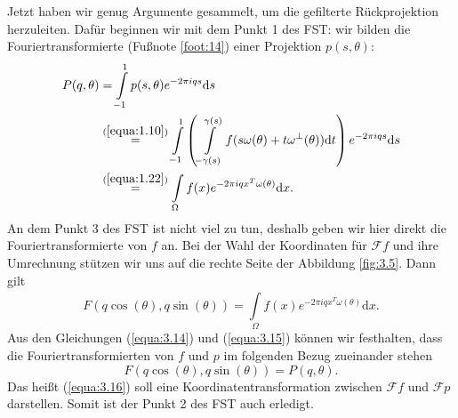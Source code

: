 Jetzt haben wir genug Argumente gesammelt, um die gefilterte Rückprojektion herzuleiten. Dafür beginnen wir mit dem Punkt 1 des FST: wir bilden die Fouriertransformierte (Fußnote \ref{foot:14}) einer Projektion $p(s, \theta)$:
\begin{equation}
	\begin{split}
		P(q, \theta) & = \int \limits_{-1}^{1} p(s, \theta) e^{-2\pi i qs} \mbox{d}s \\
		&  \stackrel{(\ref{equa:1.10})}{=} \int \limits_{-1}^{1} \left( \int\limits_{-\gamma(s)}^{\gamma(s)} f(s\omega(\theta) + t\omega^{\perp}(\theta)) \mbox{d}t \right) e^{-2\pi i qs} \mbox{d}s \\
		& \stackrel{(\ref{equa:1.22})}{=} \int \limits_{\Omega} f(x) e^{-2\pi i q x^T\omega(\theta)}\mbox{d}x.	
	\end{split}
	\label{equa:3.14}
\end{equation}	
An dem Punkt 3 des FST ist nicht viel zu tun, deshalb geben wir hier direkt die Fouriertransformierte von $f$ an. Bei der Wahl der Koordinaten für $\mathcal{F}f$ und ihre Umrechnung stützen wir uns auf die rechte Seite der Abbildung \ref{fig:3.5}. Dann gilt 
\begin{equation}
	 F(q\cos(\theta), q\sin(\theta)) = \int \limits_{\Omega}^{} f(x)e^{-2\pi i qx^T\omega(\theta)} \mbox{d}x.
	\label{equa:3.15}
\end{equation}
Aus den Gleichungen (\ref{equa:3.14}) und (\ref{equa:3.15}) können wir festhalten, dass die Fouriertransformierten von $f$ und $p$ im folgenden Bezug zueinander stehen
\begin{equation}
	F(q\cos(\theta), q\sin(\theta)) =  P(q, \theta).
	\label{equa:3.16}
\end{equation}   
Das heißt (\ref{equa:3.16}) soll eine Koordinatentransformation zwischen $\mathcal{F}f$ und $\mathcal{F}p$ darstellen. Somit ist der Punkt 2 des FST auch erledigt.

